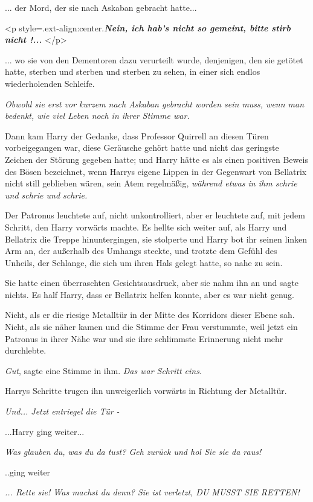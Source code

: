 ... der Mord, der sie nach Askaban gebracht hatte...

<p style=\grqq{}.ext-align:center\grqq{}.\textbf{\emph{\glqq Nein, ich hab's
nicht so gemeint, bitte stirb nicht !...\grqq{} }}</p>

... wo sie von den Dementoren dazu verurteilt wurde, denjenigen, den sie getötet
hatte, sterben und sterben und sterben zu sehen, in einer sich endlos
wiederholenden Schleife.

\emph{Obwohl sie erst vor kurzem nach Askaban gebracht worden sein muss, wenn man bedenkt, wie viel Leben noch in ihrer Stimme war.}

Dann kam Harry der Gedanke, dass Professor Quirrell an diesen Türen
vorbeigegangen war, diese Geräusche gehört hatte und nicht das geringste Zeichen
der Störung gegeben hatte; und Harry hätte es als einen positiven Beweis des
Bösen bezeichnet, wenn Harrys eigene Lippen in der Gegenwart von Bellatrix nicht
still geblieben wären, sein Atem regelmäßig, \emph{während etwas in ihm schrie
und schrie und schrie.}

Der Patronus leuchtete auf, nicht unkontrolliert, aber er leuchtete auf, mit
jedem Schritt, den Harry vorwärts machte. Es hellte sich weiter auf, als Harry
und Bellatrix die Treppe hinuntergingen, sie stolperte und Harry bot ihr seinen
linken Arm an, der außerhalb des Umhangs steckte, und trotzte dem Gefühl des
Unheils, der Schlange, die sich um ihren Hals gelegt hatte, so nahe zu sein.

Sie hatte einen überraschten Gesichtsausdruck, aber sie nahm ihn an und sagte
nichts. Es half Harry, dass er Bellatrix helfen konnte, aber es war nicht genug.

Nicht, als er die riesige Metalltür in der Mitte des Korridors dieser Ebene sah.
Nicht, als sie näher kamen und die Stimme der Frau verstummte, weil jetzt ein
Patronus in ihrer Nähe war und sie ihre schlimmste Erinnerung nicht mehr
durchlebte.

\emph{Gut}, sagte eine Stimme in ihm. \emph{Das war Schritt eins}.

Harrys Schritte trugen ihn unweigerlich vorwärts in Richtung der Metalltür.

\emph{Und... Jetzt entriegel die Tür -}

...Harry ging weiter...

\emph{Was glauben du, was du da tust? Geh zurück und hol Sie sie da raus!}

..ging weiter

\emph{... Rette sie! Was machst du denn? Sie ist verletzt, DU MUSST SIE RETTEN!}

